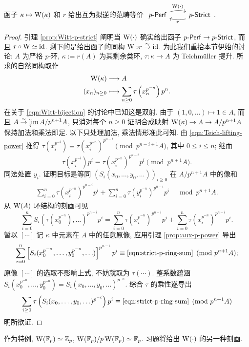 \begin{theorem}\label{prop:Witt-vs-strict}
	函子 $\kappa \mapsto \operatorname{W}(\kappa)$ 和 $r$ 给出互为拟逆的范畴等价
	$\begin{tikzcd}
		p\dcate{Perf} \arrow[bend left=15, r, "{\WittV(\cdot)}"] & p\dcate{Strict} \arrow[l, bend left=15, "r"]
	\end{tikzcd}$.
\end{theorem}
\begin{proof}
	引理 \ref{prop:Witt-p-strict} 阐明当 $\operatorname{W}(\cdot)$ 确实给出函子 $p\text{-}\mathsf{Perf} \to p\text{-}\mathsf{Strict}$, 而且 $r \circ \operatorname{W} \simeq \mathrm{id}$. 剩下的是给出函子的同构 $\operatorname{W} \circ r \stackrel{\sim}{\rightarrow} \mathrm{id}$. 为此我们重拾本节伊始的讨论: $A$ 为严格 $p$-环, $\kappa := r(A)$ 为其剩余类环, $\tau: \kappa \to A$ 为 Teichmüller 提升. 所求的自然同构取作
	\begin{align*}
		\operatorname{W}(\kappa) & \longrightarrow A \\
		(x_n)_{n \geq 0} & \longmapsto \sum_{n \geq 0} \tau\left( x_n^{p^{-n}} \right) p^n.
	\end{align*}
	在关于 \eqref{eqn:Witt-bijection} 的讨论中已知这是双射. 由于 $(1, 0, \ldots) \mapsto 1 \in A$, 而且 $A \stackrel{\sim}{\rightarrow} \varprojlim A/p^{n+1}A$, 只消对每个 $n \geq 0$ 证明合成映射 $\operatorname{W}(\kappa) \to A \to A/p^{n+1} A$ 保持加法和乘法即足. 以下只处理加法, 乘法情形准此可知. 由 \eqref{eqn:Teich-lifting-power} 推得 $\tau(x_i^{p^{-i}}) \equiv \tau(x_i^{p^{-n}})^{p^{n-i}} \pmod{p^{n-i+1}A}$, 其中 $0 \leq i \leq n$; 继而
	\[ \tau\left( x_i^{p^{-i}} \right) p^i \equiv  \tau\left( x_i^{p^{-n}} \right)^{p^{n-i}} p^i  \pmod{p^{n+1} A}. \]
	同法处置 $y_i$. 证明目标是等同 $(S_i(x_0, \ldots, y_0, \ldots))_{i \geq 0}$ 在 $A/p^{n+1} A$ 中的像和
	\begin{gather}\label{eqn:strict-p-ring-sum}
		\sum_{i=0}^n \tau\left( x_i^{p^{-n}} \right)^{p^{n-i}} p^i + \sum_{i=0}^n \tau\left( y_i^{p^{-n}} \right)^{p^{n-i}} p^i \quad \bmod p^{n+1}A.
	\end{gather}
	从 $\operatorname{W}(A)$ 环结构的刻画可见
	\[ \sum_{i=0}^n S_i\left( \tau(x_0^{p^{-n}}), \ldots \right)^{p^{n-i}} p^i = \sum_{i=0}^n \tau\left( x_i^{p^{-n}} \right)^{p^{n-i}} p^i + \sum_{i=0}^n \tau\left( x_i^{p^{-n}} \right)^{p^{n-i}} p^i. \]
	暂以 $[\cdots]$ 记 $\kappa$ 中元素在 $A$ 中的任意原像, 应用引理 \ref{prop:aux-p-power} 导出
	\[ \sum_{i=0}^n \left[ S_i(x_0^{p^{-n}}, \ldots, y_0^{p^{-n}}, \ldots) \right]^{p^{n-i}} p^i \equiv \eqref{eqn:strict-p-ring-sum} \pmod{p^{n+1}A}; \]
	原像 $[\cdots]$ 的选取不影响上式, 不妨就取为 $\tau(\cdots)$. 整系数蕴涵 $S_i(x_0^{p^{-n}}, \ldots, y_0^{p^{-n}}) = S_i(x_0, \ldots, y_0, \ldots)^{p^{-n}}$. 综合 $\tau$ 的乘性遂导出
	\[ \sum_{i \geq 0} \tau\left( S_i(x_0, \ldots, y_0, \ldots)^{p^{-i}} \right) p^i \equiv \eqref{eqn:strict-p-ring-sum} \pmod{p^{n+1}A} \]
	明所欲证.
\end{proof}
作为特例, $\operatorname{W}(\mathbb{F}_p) \simeq \mathbb{Z}_p$, $\operatorname{W}(\mathbb{F}_p)/p\operatorname{W}(\mathbb{F}_p) \simeq \mathbb{F}_p$. 习题将给出 $\operatorname{W}(\cdot)$ 的另一种刻画.

